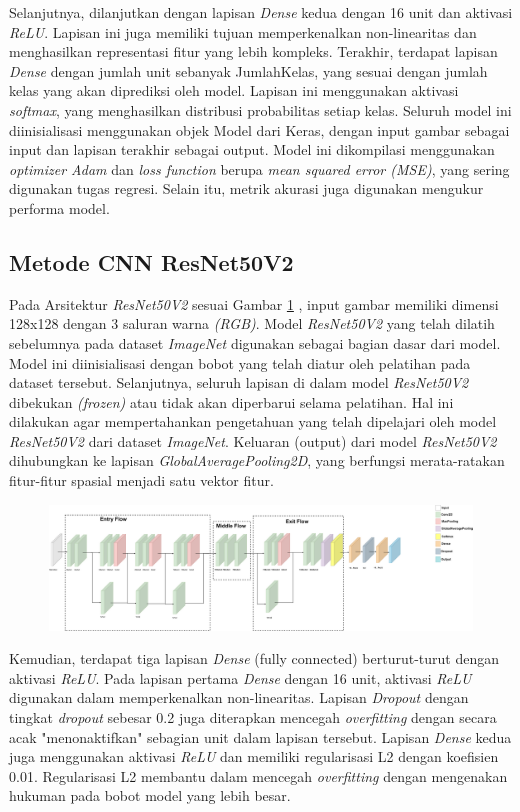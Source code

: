 Selanjutnya, dilanjutkan dengan lapisan \textit{Dense} kedua dengan 16 unit dan aktivasi \textit{ReLU}. Lapisan ini juga memiliki tujuan memperkenalkan non-linearitas dan menghasilkan representasi fitur yang lebih kompleks. Terakhir, terdapat lapisan \textit{Dense} dengan jumlah unit sebanyak JumlahKelas, yang sesuai dengan jumlah kelas yang akan diprediksi oleh model. Lapisan ini menggunakan aktivasi \textit{softmax}, yang menghasilkan distribusi probabilitas setiap kelas. Seluruh model ini diinisialisasi menggunakan objek Model dari Keras, dengan input gambar sebagai input dan lapisan terakhir sebagai output. Model ini dikompilasi menggunakan \textit{optimizer Adam} dan \textit{loss function} berupa\textit{ mean squared error (MSE)}, yang sering digunakan tugas regresi. Selain itu, metrik akurasi juga digunakan mengukur performa model.

\subsection{Metode CNN ResNet50V2}
Pada Arsitektur \textit{ResNet50V2} sesuai Gambar \ref{fig:textitResNet50V2} , input gambar memiliki dimensi 128x128 dengan 3 saluran warna \textit{(RGB)}. Model \textit{ResNet50V2} yang telah dilatih sebelumnya pada dataset \textit{ImageNet} digunakan sebagai bagian dasar dari model. Model ini diinisialisasi dengan bobot yang telah diatur oleh pelatihan pada dataset tersebut. Selanjutnya, seluruh lapisan di dalam model \textit{ResNet50V2} dibekukan \textit{(frozen)} atau tidak akan diperbarui selama pelatihan. Hal ini dilakukan agar mempertahankan pengetahuan yang telah dipelajari oleh model \textit{ResNet50V2} dari dataset \textit{ImageNet}. Keluaran (output) dari model \textit{ResNet50V2} dihubungkan ke lapisan \textit{GlobalAveragePooling2D}, yang berfungsi merata-ratakan fitur-fitur spasial menjadi satu vektor fitur.
\begin{figure}[hbt!]
	\centering
	\includegraphics[width=0.8\linewidth]{gambar/bener/Arsitektur_ModelCNNResNet50v2_Modifikasi.png}
	\label{fig:textitResNet50V2}
\end{figure}
Kemudian, terdapat tiga lapisan \textit{Dense} (fully connected) berturut-turut dengan aktivasi \textit{ReLU}. Pada lapisan pertama \textit{Dense} dengan 16 unit, aktivasi \textit{ReLU} digunakan dalam memperkenalkan non-linearitas. Lapisan \textit{Dropout} dengan tingkat \textit{dropout} sebesar 0.2 juga diterapkan mencegah \textit{overfitting} dengan secara acak "menonaktifkan" sebagian unit dalam lapisan tersebut. Lapisan \textit{Dense} kedua juga menggunakan aktivasi \textit{ReLU} dan memiliki regularisasi L2 dengan koefisien 0.01. Regularisasi L2 membantu dalam mencegah \textit{overfitting} dengan mengenakan hukuman pada bobot model yang lebih besar.

